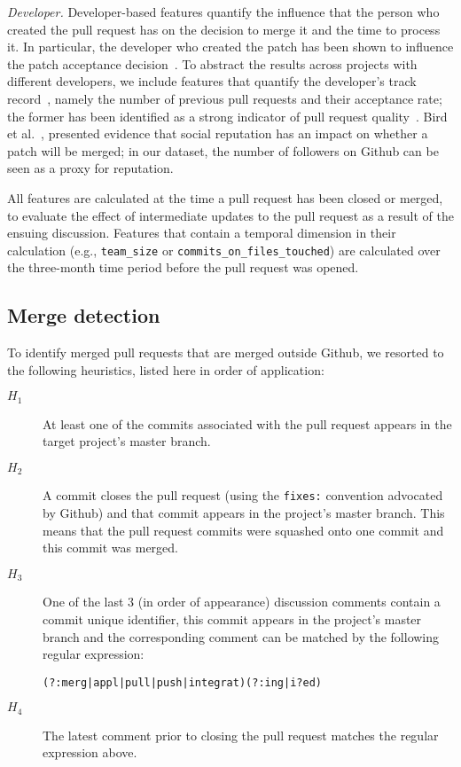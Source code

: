 \documentclass{sig-alternate}
\begin{document}
  \emph{Developer.}  Developer-based features quantify the influence that the
  person who created the pull request has on the decision to merge it and the
  time to process it. In particular, the developer who created the patch has
  been shown to influence the patch acceptance decision~\cite{Jeong09}. To
  abstract the results across projects with different developers, we include
  features that quantify the developer's track record~\cite{Dabbi12}, namely the
  number of previous pull requests and their acceptance rate; the former has
  been identified as a strong indicator of pull request quality~\cite{Pham13}.
  Bird et al.~\cite{Bird07}, presented evidence that social reputation has an
  impact on whether a patch will be merged; in our dataset, the number of
  followers on Github can be seen as a proxy for reputation.

All features are calculated at the time a pull request has been closed or
merged, to evaluate the effect of intermediate updates to the pull request as a
result of the ensuing discussion. Features that contain a temporal dimension in
their calculation (e.g., \texttt{team\_size} or
\texttt{commits\_on\_files\_touched}) are calculated over the three-month time
period before the pull request was opened.



\subsection{Merge detection}
\label{sec:mergedec}
To identify merged pull requests that are merged outside Github, we resorted to
the following heuristics, listed here in order of application:

\begin{description}

  \item[$H_1$] At least one of the commits associated with the pull request appears in the target project's master branch.

  \item[$H_2$] A commit closes the pull request (using the \texttt{fixes:}
    convention advocated by Github) and that commit appears in the project's
    master branch.  This means that the pull request commits were squashed onto
    one commit and this commit was merged.

  \item[$H_3$] One of the last 3 (in order of appearance) discussion comments contain a
    commit unique identifier, this commit appears in the project's master branch
    and the corresponding comment can be matched by the following regular
    expression:

    \begin{small}
    \texttt{(?:merg|appl|pull|push|integrat)(?:ing|i?ed)}
    \end{small}

  \item[$H_4$] The latest comment prior to closing the pull request matches the
    regular expression above.

\end{description}
\end{document}

